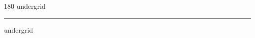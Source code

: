 
\begin{frame}
\begin{center}
\begin{turn}{180}
{\fontsize{2.5cm}{1em}\selectfont undergrid}
\end{turn}
\vspace{1em}\par  
\hrule
\vspace{1em}\par  
{\fontsize{2.5cm}{1em}\selectfont undergrid}
\end{center}
\end{frame}
